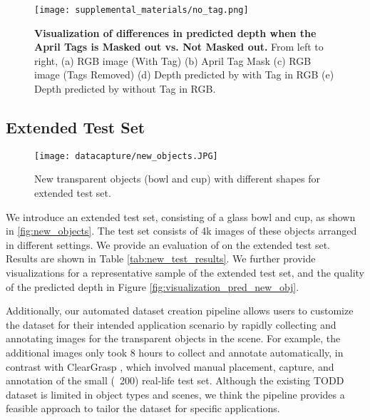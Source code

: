 \begin{figure}[t]
\centering
\texttt{[image: supplemental\_materials/no\_tag.png]}\\
\caption{\textbf{Visualization of differences in predicted depth when the April Tags is Masked out vs. Not Masked out.} From left to right, (a) RGB image (With Tag) (b) April Tag Mask (c) RGB image (Tags Removed) (d) Depth predicted by \algoName with Tag in RGB (e) Depth predicted by \algoName without Tag in RGB.
}
\label{fig:tags_removed}
\end{figure}

\subsection{Extended Test Set}
\begin{figure}[t]
\centering
\texttt{[image: datacapture/new\_objects.JPG]}\\
\caption{New transparent objects (bowl and cup) with different shapes for \dataName extended test set.
}
\label{fig:new_objects}
\end{figure}
We introduce an extended test set, consisting of a glass bowl and cup, as shown in \autoref{fig:new_objects}. The test set consists of 4k images of these objects arranged in different settings. We provide an evaluation of \algoName on the extended test set. Results are shown in Table \ref{tab:new_test_results}. We further provide visualizations for a representative sample of the extended test set, and the quality of the predicted depth in Figure \ref{fig:visualization_pred_new_obj}. 



Additionally, our automated dataset creation pipeline allows users to customize the dataset for their intended application scenario by rapidly collecting and annotating images for the transparent objects in the scene. For example, the additional images only took 8 hours to collect and annotate automatically, in contrast with ClearGrasp \citep{ClearGrasp}, which involved manual placement, capture, and annotation of the small (~200) real-life test set. Although the existing TODD dataset is limited in object types and scenes, we think the pipeline provides a feasible approach to tailor the dataset for specific applications.


